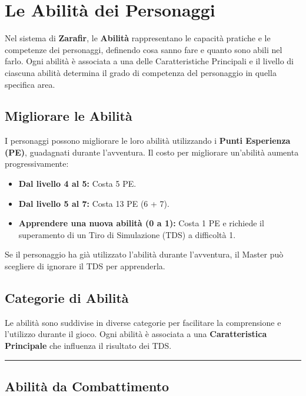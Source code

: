 \documentclass[../manuale_main.tex]{subfiles}
\begin{document}
\section{Le Abilità dei Personaggi}

Nel sistema di \textbf{Zarafir}, le \textbf{Abilità} rappresentano le capacità pratiche e le competenze dei personaggi, definendo cosa sanno fare e quanto sono abili nel farlo. Ogni abilità è associata a una delle Caratteristiche Principali e il livello di ciascuna abilità determina il grado di competenza del personaggio in quella specifica area.

\vspace{0.3cm}

\subsection{Migliorare le Abilità}
I personaggi possono migliorare le loro abilità utilizzando i \textbf{Punti Esperienza (PE)}, guadagnati durante l’avventura. Il costo per migliorare un’abilità aumenta progressivamente:

\begin{itemize}
    \item \textbf{Dal livello 4 al 5:} Costa 5 PE.
    \item \textbf{Dal livello 5 al 7:} Costa 13 PE (6 + 7).
    \item \textbf{Apprendere una nuova abilità (0 a 1):} Costa 1 PE e richiede il superamento di un Tiro di Simulazione (TDS) a difficoltà 1.
\end{itemize}

Se il personaggio ha già utilizzato l’abilità durante l’avventura, il Master può scegliere di ignorare il TDS per apprenderla.

\vspace{0.3cm}

\subsection{Categorie di Abilità}
Le abilità sono suddivise in diverse categorie per facilitare la comprensione e l’utilizzo durante il gioco. Ogni abilità è associata a una \textbf{Caratteristica Principale} che influenza il risultato dei TDS.

\vspace{0.5cm}
\rule{\textwidth}{0.4pt}
\vspace{0.5cm}

\subsection{Abilità da Combattimento}
\end{document}
